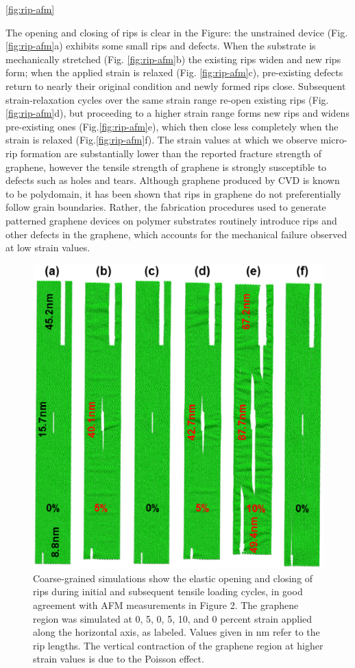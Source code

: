 \documentclass[edeposit,fullpage,draftthesis]{uiucthesis2009}
\begin{document}
        \ref{fig:rip-afm}
        
        The opening and closing of rips is clear in the Figure:  the unstrained device
        (Fig. \ref{fig:rip-afm}a) exhibits some small rips and defects. When the substrate is
        mechanically stretched (Fig. \ref{fig:rip-afm}b) the existing rips widen and new rips form;
        when the applied strain is relaxed (Fig. \ref{fig:rip-afm}c), pre-existing defects return to
        nearly their original condition and newly formed rips close. Subsequent
        strain-relaxation cycles over the same strain range re-open existing rips (Fig.\ref{fig:rip-afm}d), 
        but proceeding to a higher strain range forms new rips and widens
        pre-existing ones (Fig.\ref{fig:rip-afm}e), which then close less completely when the strain
        is relaxed (Fig.\ref{fig:rip-afm}f). The strain values at which we observe micro-rip formation
        are substantially lower than the reported fracture strength of
        graphene\cite{Lee2008}, however the tensile strength of graphene is strongly
        susceptible to defects such as holes and tears\cite{Lee2013}. Although graphene
        produced by CVD is known to be polydomain, it has been shown that rips in
        graphene do not preferentially follow grain boundaries\cite{Kim2012}. Rather,
        the fabrication procedures used to generate patterned graphene devices on
        polymer substrates routinely introduce rips and other defects in the graphene,
        which accounts for the mechanical failure observed at low strain values.
 
        \begin{figure}
        \centering
        \includegraphics[width=0.5\linewidth]{images/resultsanddiscussion/rippingpaper/Figure4.eps}
        \caption[Simulations of rip formation in uniaxially strained graphene]
            {Coarse-grained simulations show the elastic opening and closing of
            rips during initial and subsequent tensile loading cycles, in good agreement
            with AFM measurements in Figure 2. The graphene region was simulated at 0, 5,
            0, 5, 10, and 0 percent strain applied along the horizontal axis, as labeled.
            Values given in nm refer to the rip lengths. The vertical contraction of the
            graphene region at higher strain values is due to the Poisson effect.}
        \label{fig:rip-simulation}
        \end{figure}
       
\end{document}
